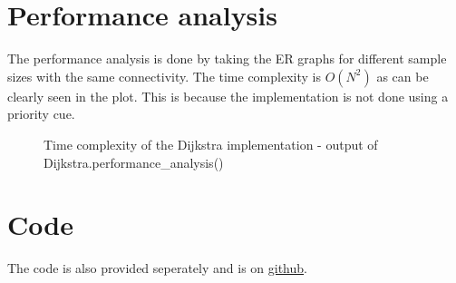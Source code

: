 \documentclass[11pt,fleqn]{article}
\begin{document}
    \section{Performance analysis}
    The performance analysis is done by taking the ER graphs for different sample sizes with the same connectivity. The time complexity is $O(N^2)$ as can be clearly seen in the plot. This is because the implementation is not done using a priority cue.
    \begin{figure}[H]
        \centering
        
        \caption{Time complexity of the Dijkstra implementation - output of Dijkstra.performance\_analysis()}
        \label{fig:ER_example}
    \end{figure}


    \section{Code}
    \label{section:code}
    The code is also provided seperately and is on \href{https://github.com/SjdTl/DCN-Bonus-Assignment-2.git}{\color{blue}github}.
    \inputminted[breaklines=true]{python3}{Dijkstra.py}
\end{document}
